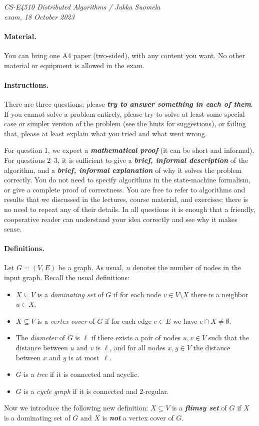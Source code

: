 \documentclass[12pt,a4paper]{article}
\newcommand{\hl}[1]{\textbf{\emph{#1}}}
\newcommand{\cemph}[1]{\textbf{\emph{\boldmath #1}}}
\begin{document}
\noindent
\emph{CS-E4510 Distributed Algorithms / Jukka Suomela\\
exam, 18 October 2023}

\paragraph{Material.}

You can bring one A4 paper (two-sided), with any content you want. No other material or equipment is allowed in the exam.

\paragraph{Instructions.}

There are three questions; please \cemph{try to answer something in each of them}. If you cannot solve a problem entirely, please try to solve at least some special case or simpler version of the problem (see the hints for suggestions), or failing that, please at least explain what you tried and what went wrong.

For question 1, we expect a \cemph{mathematical proof} (it can be short and informal). For questions 2--3, it is sufficient to give a \cemph{brief, informal description} of the algorithm, and a \cemph{brief, informal explanation} of why it solves the problem correctly. You do not need to specify algorithms in the state-machine formalism, or give a complete proof of correctness. You are free to refer to algorithms and results that we discussed in the lectures, course material, and exercises; there is no need to repeat any of their details. In all questions it is enough that a friendly, cooperative reader can understand your idea correctly and see why it makes sense.

\paragraph{Definitions.}

Let $G=(V,E)$ be a graph. As usual, $n$ denotes the number of nodes in the input graph. Recall the usual definitions:
\begin{itemize}
    \item $X \subseteq V$ is a \emph{dominating set} of $G$ if for each node $v \in V \setminus X$ there is a neighbor $u \in X$.
    \item $X \subseteq V$ is a \emph{vertex cover} of $G$ if for each edge $e \in E$ we have $e \cap X \ne \emptyset$.
    \item The \emph{diameter} of $G$ is $\ell$ if there exists a pair of nodes $u, v \in V$ such that the distance between $u$ and $v$ is $\ell$, and for all nodes $x, y \in V$ the distance between $x$ and $y$ is at most~$\ell$.
    \item $G$ is a \emph{tree} if it is connected and acyclic.
    \item $G$ is a \emph{cycle graph} if it is connected and $2$-regular.
\end{itemize}
Now we introduce the following new definition: $X \subseteq V$ is a \hl{flimsy set} of $G$ if $X$ is a dominating set of $G$ and $X$ is \hl{not} a vertex cover of $G$.
\end{document}
